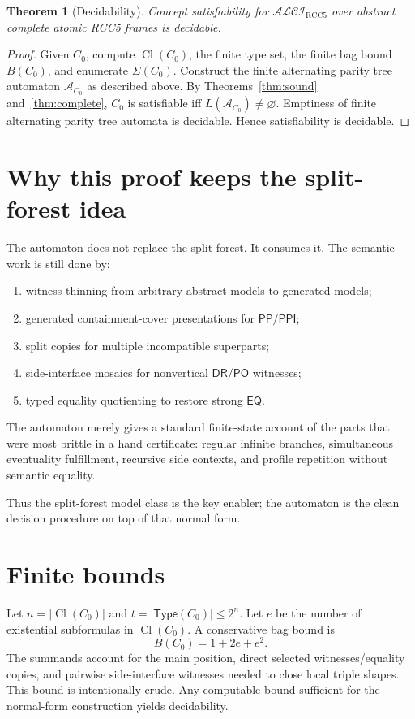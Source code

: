 \documentclass[11pt]{article}
\newtheorem{theorem}{Theorem}[section]
\newcommand{\ALCI}{\mathcal{ALCI}}
\newcommand{\RCC}{\mathrm{RCC5}}
\newcommand{\EQ}{\mathsf{EQ}}
\newcommand{\PP}{\mathsf{PP}}
\newcommand{\PPI}{\mathsf{PPI}}
\newcommand{\PO}{\mathsf{PO}}
\newcommand{\DR}{\mathsf{DR}}
\newcommand{\Cl}{\operatorname{Cl}}
\newcommand{\Aut}{\mathcal A}
\begin{document}
\begin{theorem}[Decidability]
Concept satisfiability for $\ALCI_{\RCC}$ over abstract complete atomic RCC5 frames is decidable.
\end{theorem}

\begin{proof}
Given $C_0$, compute $\Cl(C_0)$, the finite type set, the finite bag bound $B(C_0)$, and enumerate $\Sigma(C_0)$.  Construct the finite alternating parity tree automaton $\Aut_{C_0}$ as described above.  By Theorems~\ref{thm:sound} and~\ref{thm:complete}, $C_0$ is satisfiable iff $L(\Aut_{C_0})\ne\varnothing$.  Emptiness of finite alternating parity tree automata is decidable.  Hence satisfiability is decidable.
\end{proof}

\section{Why this proof keeps the split-forest idea}

The automaton does not replace the split forest.  It consumes it.  The semantic work is still done by:
\begin{enumerate}[label=(\alph*)]
\item witness thinning from arbitrary abstract models to generated models;
\item generated containment-cover presentations for $\PP/\PPI$;
\item split copies for multiple incompatible superparts;
\item side-interface mosaics for nonvertical $\DR/\PO$ witnesses;
\item typed equality quotienting to restore strong $\EQ$.
\end{enumerate}
The automaton merely gives a standard finite-state account of the parts that were most brittle in a hand certificate: regular infinite branches, simultaneous eventuality fulfillment, recursive side contexts, and profile repetition without semantic equality.

Thus the split-forest model class is the key enabler; the automaton is the clean decision procedure on top of that normal form.

\appendix

\section{Finite bounds}

Let $n=|\Cl(C_0)|$ and $t=|\mathsf{Type}(C_0)|\le 2^n$.  Let $e$ be the number of existential subformulas in $\Cl(C_0)$.  A conservative bag bound is
\[
  B(C_0)=1+2e+e^2.
\]
The summands account for the main position, direct selected witnesses/equality copies, and pairwise side-interface witnesses needed to close local triple shapes.  This bound is intentionally crude.  Any computable bound sufficient for the normal-form construction yields decidability.
\end{document}

